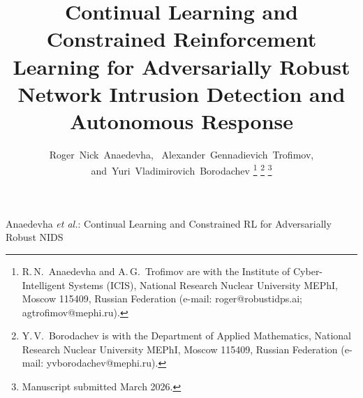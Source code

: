 \documentclass[journal]{IEEEtran}
\theoremstyle{definition}
\theoremstyle{remark}
\begin{document}
\title{Continual Learning and Constrained Reinforcement Learning for Adversarially Robust Network Intrusion Detection and Autonomous Response}

\author{Roger~Nick~Anaedevha,~
        Alexander~Gennadievich~Trofimov,
        and~Yuri~Vladimirovich~Borodachev%
\thanks{R.\,N.~Anaedevha and A.\,G.~Trofimov are with the Institute
of Cyber-Intelligent Systems (ICIS), National Research Nuclear University
MEPhI, Moscow 115409, Russian Federation
(e-mail: roger@robustidps.ai; agtrofimov@mephi.ru).}%
\thanks{Y.\,V.~Borodachev is with the Department of Applied Mathematics,
National Research Nuclear University MEPhI, Moscow 115409,
Russian Federation (e-mail: yvborodachev@mephi.ru).}%
\thanks{Manuscript submitted March 2026.}}

%
{Anaedevha \MakeLowercase{\textit{et al.}}: Continual Learning and Constrained RL for Adversarially Robust NIDS}

\maketitle
\end{document}
